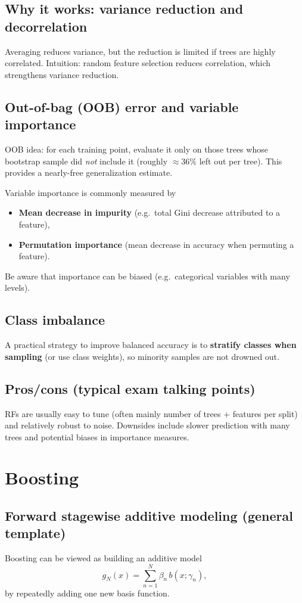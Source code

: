 \documentclass[11pt, oneside]{book}
\newcommand{\1}{\ind}                       %
\begin{document}
\subsection{Why it works: variance reduction and decorrelation}
Averaging reduces variance, but the reduction is limited if trees are highly correlated.
Intuition: random feature selection reduces correlation, which strengthens variance reduction.

\subsection{Out-of-bag (OOB) error and variable importance}
OOB idea: for each training point, evaluate it only on those trees whose bootstrap sample did \emph{not} include it (roughly $\approx 36\%$ left out per tree).
This provides a nearly-free generalization estimate.

Variable importance is commonly measured by
\begin{itemize}
  \item \textbf{Mean decrease in impurity} (e.g.\ total Gini decrease attributed to a feature),
  \item \textbf{Permutation importance} (mean decrease in accuracy when permuting a feature).
\end{itemize}
Be aware that importance can be biased (e.g.\ categorical variables with many levels).

\subsection{Class imbalance}
A practical strategy to improve balanced accuracy is to \textbf{stratify classes when sampling} (or use class weights), so minority samples are not drowned out.

\subsection{Pros/cons (typical exam talking points)}
RFs are usually easy to tune (often mainly number of trees + features per split) and relatively robust to noise.
Downsides include slower prediction with many trees and potential biases in importance measures.

\section{Boosting}
\subsection{Forward stagewise additive modeling (general template)}
Boosting can be viewed as building an additive model
\[
  g_N(x)=\sum_{n=1}^{N}\beta_n\,b(x;\gamma_n),
\]
by repeatedly adding one new basis function.
\end{document}
